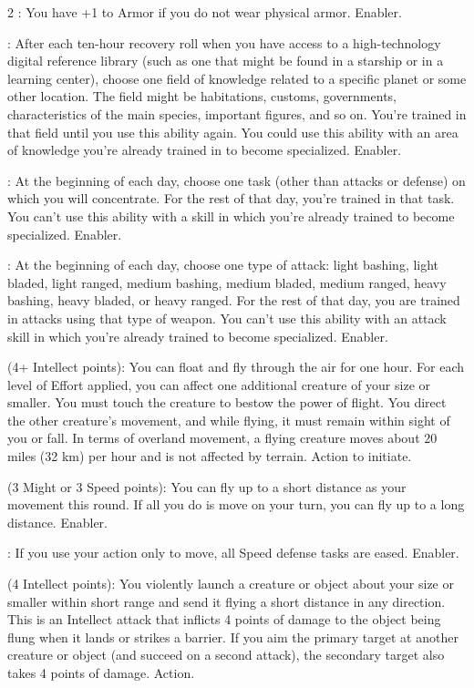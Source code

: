 \begin{multicols}{2}
: You have +1 to Armor if you do not wear physical armor. Enabler. 
 
: After each ten-hour recovery roll when you have access to a high-technology digital reference library (such as one that might be found in a starship or in a learning center), choose one field of knowledge related to a specific planet or some other location. The field might be habitations, customs, governments, characteristics of the main species, important figures, and so on. You’re trained in that field until you use this ability again. You could use this ability with an area of knowledge you’re already trained in to become specialized. Enabler. 
 
: At the beginning of each day, choose one task (other than attacks or defense) on which you will concentrate. For the rest of that day, you’re trained in that task. You can’t use this ability with a skill in which you’re already trained to become specialized. Enabler.
 
: At the beginning of each day, choose one type of attack: light bashing, light bladed, light ranged, medium bashing, medium bladed, medium ranged, heavy bashing, heavy bladed, or heavy ranged. For the rest of that day, you are trained in attacks using that type of weapon. You can’t use this ability with an attack skill in which you’re already trained to become specialized. Enabler.

 (4+ Intellect points): You can float and fly through the air for one hour. For each level of Effort applied, you can affect one additional creature of your size or smaller. You must touch the creature to bestow the power of flight. You direct the other creature’s movement, and while flying, it must remain within sight of you or fall. In terms of overland movement, a flying creature moves about 20 miles (32 km) per hour and is not affected by terrain. Action to initiate. 
 
 (3 Might or 3 Speed points): You can fly up to a short distance as your movement this round. If all you do is move on your turn, you can fly up to a long distance. Enabler.

: If you use your action only to move, all Speed defense tasks are eased. Enabler. 
 
 (4 Intellect points): You violently launch a creature or object about your size or smaller within short range and send it flying a short distance in any direction. This is an Intellect attack that inflicts 4 points of damage to the object being flung when it lands or strikes a barrier. If you aim the primary target at another creature or object (and succeed on a second attack), the secondary target also takes 4 points of damage. Action. 
 

\end{multicols}
